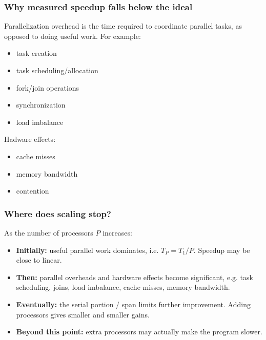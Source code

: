 \documentclass[11pt]{article}
\begin{document}
\subsubsection{Why measured speedup falls below the ideal}
Parallelization overhead is the time required to coordinate parallel tasks, as opposed to doing useful work. For example:
\begin{itemize}
    \item task creation
    \item task scheduling/allocation
    \item fork/join operations
    \item synchronization
    \item load imbalance
\end{itemize}
Hadware effects:
\begin{itemize}
    \item cache misses
    \item memory bandwidth
    \item contention
\end{itemize}
\subsubsection{Where does scaling stop?}
As the number of processors $P$ increases:
\begin{itemize}
    \item \textbf{Initially:} useful parallel work dominates, i.e. $T_P=T_1/P$. Speedup may be close to linear.
    \item \textbf{Then:} parallel overheads and hardware effects become significant, e.g. task scheduling, joins, load imbalance, cache misses, memory bandwidth.
    \item \textbf{Eventually:} the serial portion / span limits further improvement. Adding processors gives smaller and smaller gains.
    \item \textbf{Beyond this point:} extra processors may actually make the program slower.
\end{itemize}
\end{document}
